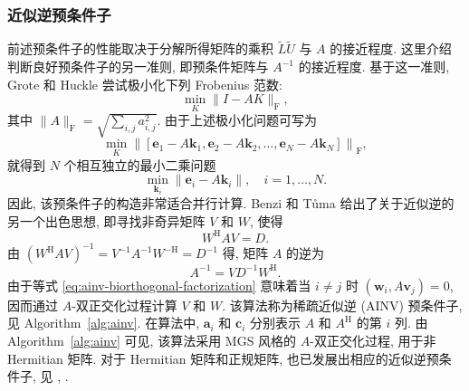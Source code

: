 \subsubsection{{近似逆预条件子}}\label{subsec:approximate-inverse-preconditioners}
{前述预条件子的性能取决于分解所得矩阵的乘积 $\widetilde L\widetilde U$ 与 $A$ 的接近程度. 这里介绍判断良好预条件子的另一准则, 即预条件矩阵与 $A^{-1}$ 的接近程度. 基于这一准则, Grote 和 Huckle  尝试极小化下列 Frobenius 范数:}
\[\min_K\|I-AK\|_{\mathrm F},\]
{其中 $\|A\|_{\mathrm F}=\sqrt{\sum_{i,j}a_{i,j}^2}$. 由于上述极小化问题可写为}
\[\min_K\left\|[\bm e_1-A\bm k_1,\bm e_2-A\bm k_2,\ldots,\bm e_N-A\bm k_N]\right\|_{\mathrm F},\]
{就得到 $N$ 个相互独立的最小二乘问题}
\[\min_{\bm k_i}\|\bm e_i-A\bm k_i\|,\quad i=1,\ldots,N.\]
{因此, 该预条件子的构造非常适合并行计算.}
{Benzi 和 Tůma  给出了关于近似逆的另一个出色思想, 即寻找非奇异矩阵 $V$ 和 $W$, 使得}
\begin{equation}\label{eq:ainv-biorthogonal-factorization}W^{\mathrm H}AV=D.\end{equation}
{由 $(W^{\mathrm H}AV)^{-1}=V^{-1}A^{-1}W^{-\mathrm H}=D^{-1}$ 得, 矩阵 $A$ 的逆为}
\[A^{-1}=VD^{-1}W^{\mathrm H}.\]
{由于等式 \eqref{eq:ainv-biorthogonal-factorization} 意味着当 $i\ne j$ 时 $(\bm w_i,A\bm v_j)=0$, 因而通过 $A$-双正交化过程计算 $V$ 和 $W$. 该算法称为稀疏近似逆 (AINV) 预条件子, 见 Algorithm\ \ref{alg:ainv}. 在算法中, $\bm a_i$ 和 $\bm c_i$ 分别表示 $A$ 和 $A^{\mathrm H}$ 的第 $i$ 列. 由 Algorithm\ \ref{alg:ainv} 可见, 该算法采用 MGS 风格的 $A$-双正交化过程, 用于非 Hermitian 矩阵. 对于 Hermitian 矩阵和正规矩阵, 也已发展出相应的近似逆预条件子, 见 , .}

